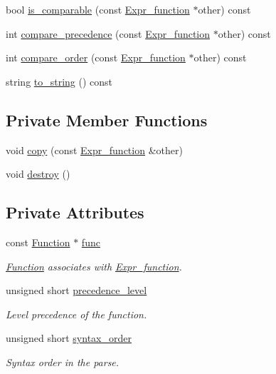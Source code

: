 \begin{CompactItemize}
\item 
bool \hyperlink{classgenevalmag_1_1Expr__function_24aaf520c742fde5eff5c8c596549009}{is\_\-comparable} (const \hyperlink{classgenevalmag_1_1Expr__function}{Expr\_\-function} $\ast$other) const 
\item 
int \hyperlink{classgenevalmag_1_1Expr__function_83c21a4b327d045d8da159d6079dd99c}{compare\_\-precedence} (const \hyperlink{classgenevalmag_1_1Expr__function}{Expr\_\-function} $\ast$other) const 
\item 
int \hyperlink{classgenevalmag_1_1Expr__function_4608528d2e116c0794eb78f2724b6a18}{compare\_\-order} (const \hyperlink{classgenevalmag_1_1Expr__function}{Expr\_\-function} $\ast$other) const 
\item 
string \hyperlink{classgenevalmag_1_1Expr__function_daaebd5427337bb2288c47a16af804d8}{to\_\-string} () const 
\end{CompactItemize}
\subsection*{Private Member Functions}
\begin{CompactItemize}
\item 
void \hyperlink{classgenevalmag_1_1Expr__function_4cae50a094103bbfe2c6dba9b1350946}{copy} (const \hyperlink{classgenevalmag_1_1Expr__function}{Expr\_\-function} \&other)
\item 
void \hyperlink{classgenevalmag_1_1Expr__function_3d90bbd7e17670edc01ba21d8a753315}{destroy} ()
\end{CompactItemize}
\subsection*{Private Attributes}
\begin{CompactItemize}
\item 
const \hyperlink{classgenevalmag_1_1Function}{Function} $\ast$ \hyperlink{classgenevalmag_1_1Expr__function_8248bebb1840bf2d2fcb2e818ba5a3eb}{func}
\begin{CompactList}\small\item\em \hyperlink{classgenevalmag_1_1Function}{Function} associates with \hyperlink{classgenevalmag_1_1Expr__function}{Expr\_\-function}. \item\end{CompactList}\item 
unsigned short \hyperlink{classgenevalmag_1_1Expr__function_98a74d7ae5aaeb4b0d69c79845f8ce8f}{precedence\_\-level}
\begin{CompactList}\small\item\em Level precedence of the function. \item\end{CompactList}\item 
unsigned short \hyperlink{classgenevalmag_1_1Expr__function_dfde16cebcb1963e540a8f92eddb69a1}{syntax\_\-order}
\begin{CompactList}\small\item\em Syntax order in the parse. \item\end{CompactList}\end{CompactItemize}


